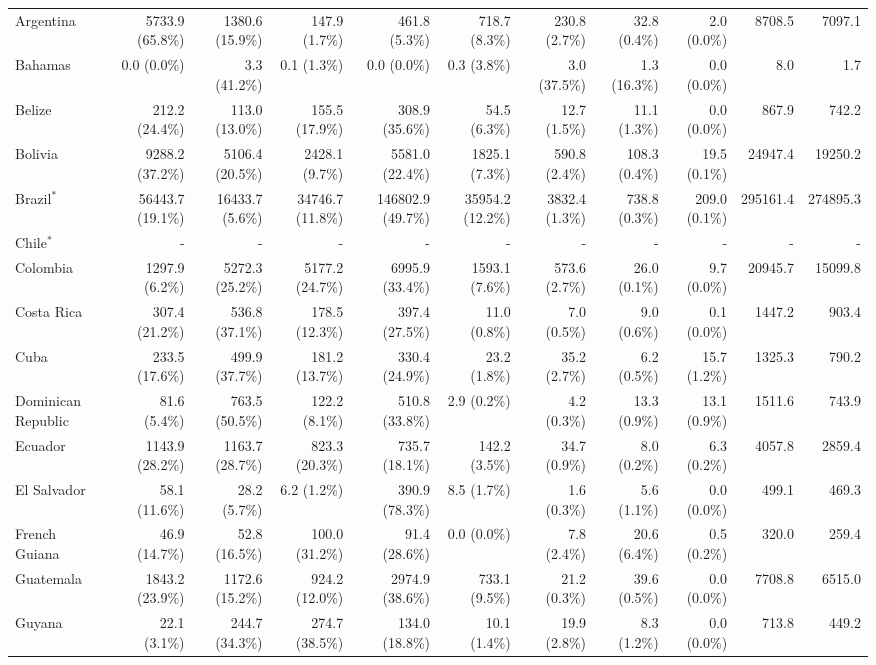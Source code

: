 \begin{scriptsize}
\begin{landscape}
\begin{center}
\begin{longtable}[ht]{lrrrrrrrrrr}
			Argentina&5733.9 (65.8\%)&1380.6 (15.9\%)&147.9 (1.7\%)&461.8 (5.3\%)&718.7 (8.3\%)&230.8 (2.7\%)&32.8 (0.4\%)&2.0 (0.0\%)&8708.5&7097.1\\
			Bahamas&0.0 (0.0\%)&3.3 (41.2\%)&0.1 (1.3\%)&0.0 (0.0\%)&0.3 (3.8\%)&3.0 (37.5\%)&1.3 (16.3\%)&0.0 (0.0\%)&8.0&1.7\\
			Belize&212.2 (24.4\%)&113.0 (13.0\%)&155.5 (17.9\%)&308.9 (35.6\%)&54.5 (6.3\%)&12.7 (1.5\%)&11.1 (1.3\%)&0.0 (0.0\%)&867.9&742.2\\
			Bolivia&9288.2 (37.2\%)&5106.4 (20.5\%)&2428.1 (9.7\%)&5581.0 (22.4\%)&1825.1 (7.3\%)&590.8 (2.4\%)&108.3 (0.4\%)&19.5 (0.1\%)&24947.4&19250.2\\
			Brazil$^*$&56443.7 (19.1\%)&16433.7 (5.6\%)&34746.7 (11.8\%)&146802.9 (49.7\%)&35954.2 (12.2\%)&3832.4 (1.3\%)&738.8 (0.3\%)&209.0 (0.1\%)&295161.4&274895.3\\
			Chile$^*$&-&-&-&-&-&-&-&-&-&-\\
			Colombia&1297.9 (6.2\%)&5272.3 (25.2\%)&5177.2 (24.7\%)&6995.9 (33.4\%)&1593.1 (7.6\%)&573.6 (2.7\%)&26.0 (0.1\%)&9.7 (0.0\%)&20945.7&15099.8\\
			Costa Rica&307.4 (21.2\%)&536.8 (37.1\%)&178.5 (12.3\%)&397.4 (27.5\%)&11.0 (0.8\%)&7.0 (0.5\%)&9.0 (0.6\%)&0.1 (0.0\%)&1447.2&903.4\\
			Cuba&233.5 (17.6\%)&499.9 (37.7\%)&181.2 (13.7\%)&330.4 (24.9\%)&23.2 (1.8\%)&35.2 (2.7\%)&6.2 (0.5\%)&15.7 (1.2\%)&1325.3&790.2\\
			Dominican Republic&81.6 (5.4\%)&763.5 (50.5\%)&122.2 (8.1\%)&510.8 (33.8\%)&2.9 (0.2\%)&4.2 (0.3\%)&13.3 (0.9\%)&13.1 (0.9\%)&1511.6&743.9\\
			Ecuador&1143.9 (28.2\%)&1163.7 (28.7\%)&823.3 (20.3\%)&735.7 (18.1\%)&142.2 (3.5\%)&34.7 (0.9\%)&8.0 (0.2\%)&6.3 (0.2\%)&4057.8&2859.4\\
			El Salvador&58.1 (11.6\%)&28.2 (5.7\%)&6.2 (1.2\%)&390.9 (78.3\%)&8.5 (1.7\%)&1.6 (0.3\%)&5.6 (1.1\%)&0.0 (0.0\%)&499.1&469.3\\
			French Guiana&46.9 (14.7\%)&52.8 (16.5\%)&100.0 (31.2\%)&91.4 (28.6\%)&0.0 (0.0\%)&7.8 (2.4\%)&20.6 (6.4\%)&0.5 (0.2\%)&320.0&259.4\\
			Guatemala&1843.2 (23.9\%)&1172.6 (15.2\%)&924.2 (12.0\%)&2974.9 (38.6\%)&733.1 (9.5\%)&21.2 (0.3\%)&39.6 (0.5\%)&0.0 (0.0\%)&7708.8&6515.0\\
			Guyana&22.1 (3.1\%)&244.7 (34.3\%)&274.7 (38.5\%)&134.0 (18.8\%)&10.1 (1.4\%)&19.9 (2.8\%)&8.3 (1.2\%)&0.0 (0.0\%)&713.8&449.2\\

\end{longtable}
\end{center}
\end{landscape}
\end{scriptsize}
